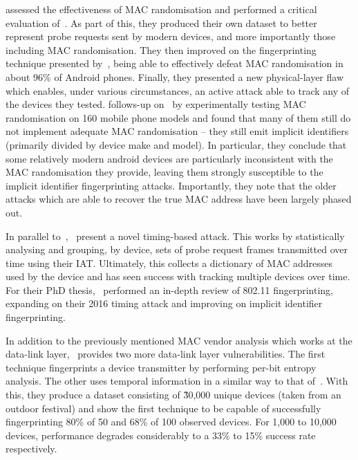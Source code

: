  assessed the effectiveness of MAC randomisation and performed a critical evaluation of~.
As part of this, they produced their own dataset to better represent probe requests sent by modern devices, and more importantly those including MAC randomisation.
They then improved on the fingerprinting technique presented by~\cite{Vanhoef2016}, being able to effectively defeat MAC randomisation in about 96\% of Android phones.
Finally, they presented a new physical-layer flaw which enables, under various circumstances, an active attack able to track any of the devices they tested.
 follows-up on~\cite{Martin2017} by experimentally testing MAC randomisation on 160 mobile phone models and found that many of them still do not implement adequate MAC randomisation -- they still emit implicit identifiers (primarily divided by device make and model).
In particular, they conclude that some relatively modern android devices are particularly inconsistent with the MAC randomisation they provide, leaving them strongly susceptible to the implicit identifier fingerprinting attacks.
Importantly, they note that the older attacks which are able to recover the true MAC address have been largely phased out.

In parallel to~\cite{Vanhoef2016},~ present a novel timing-based attack.
This works by statistically analysing and grouping, by device, sets of probe request frames transmitted over time using their IAT.
Ultimately, this collects a dictionary of MAC addresses used by the device and has seen success with tracking multiple devices over time.
For their PhD thesis,~ performed an in-depth review of 802.11 fingerprinting, expanding on their 2016 timing attack and improving on implicit identifier fingerprinting.

In addition to the previously mentioned MAC vendor analysis which works at the data-link layer,~ provides two more data-link layer vulnerabilities.
The first technique fingerprints a device transmitter by performing per-bit entropy analysis.
The other uses temporal information in a similar way to that of~\cite{Matte2016}.
With this, they produce a dataset consisting of \~30,000 unique devices (taken from an outdoor festival) and show the first technique to be capable of successfully fingerprinting 80\% of 50 and 68\% of 100 observed devices.
For 1,000 to 10,000 devices, performance degrades considerably to a 33\% to 15\% success rate respectively.

